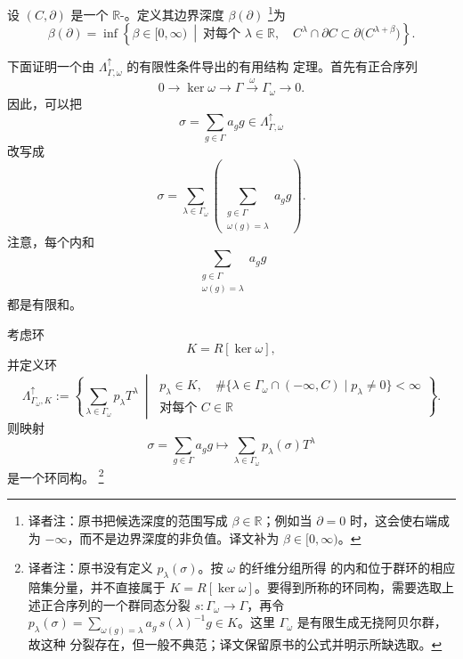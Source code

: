 \begin{definition}
\label{def:boundary-depth}
设 $(C,\partial)$ 是一个 $\mathbb R$-\termFilteredChainComplex{}。定义其边界深度
$\beta(\partial)$
\footnote{译者注：原书把候选深度的范围写成 $\beta\in\mathbb R$；例如当
$\partial=0$ 时，这会使右端成为 $-\infty$，而不是边界深度的非负值。译文补为
$\beta\in[0,\infty)$。}为
\[
  \beta(\partial)
  =\inf\left\{
    \beta\in[0,\infty)
    \ \middle|\
    \text{对每个 }\lambda\in\mathbb R,\quad
    C^\lambda\cap\partial C
    \subset\partial\bigl(C^{\lambda+\beta}\bigr)
  \right\}.
\]
\end{definition}

下面证明一个由 $\Lambda^\uparrow_{\Gamma,\omega}$ 的有限性条件导出的有用结构
定理。首先有正合序列
\[
  0\longrightarrow\ker\omega
  \longrightarrow\Gamma
  \xrightarrow{\ \omega\ }\Gamma_\omega
  \longrightarrow0.
\]
因此，可以把
\[
  \sigma=\sum_{g\in\Gamma}a_g g
  \in\Lambda^\uparrow_{\Gamma,\omega}
\]
改写成
\[
  \sigma
  =\sum_{\lambda\in\Gamma_\omega}
    \left(
      \sum_{\substack{g\in\Gamma\\\omega(g)=\lambda}}a_g g
    \right).
\]
注意，每个内和
\[
  \sum_{\substack{g\in\Gamma\\\omega(g)=\lambda}}a_g g
\]
都是有限和。

\begin{proposition}
\label{prop:novikov-ring-period-group-coefficients}
考虑环
\[
  K=R[\ker\omega],
\]
并定义环
\[
  \Lambda^\uparrow_{\Gamma_\omega,K}
  :=
  \left\{
    \sum_{\lambda\in\Gamma_\omega}p_\lambda T^\lambda
    \ \middle|\
    \begin{gathered}
      p_\lambda\in K,\quad
      \#\{\lambda\in\Gamma_\omega\cap(-\infty,C)
        \mid p_\lambda\ne0\}<\infty\\
      \text{对每个 }C\in\mathbb R
    \end{gathered}
  \right\}.
\]
则映射
\[
  \sigma=\sum_{g\in\Gamma}a_g g
  \longmapsto
  \sum_{\lambda\in\Gamma_\omega}p_\lambda(\sigma)T^\lambda
\]
是一个环同构。
\footnote{译者注：原书没有定义 $p_\lambda(\sigma)$。按 $\omega$ 的纤维分组所得
的内和位于群环的相应陪集分量，并不直接属于
$K=R[\ker\omega]$。要得到所称的环同构，需要选取上述正合序列的一个群同态分裂
$s:\Gamma_\omega\to\Gamma$，再令
$p_\lambda(\sigma)=\sum_{\omega(g)=\lambda}
a_g\,s(\lambda)^{-1}g\in K$。这里 $\Gamma_\omega$ 是有限生成无挠阿贝尔群，故这种
分裂存在，但一般不典范；译文保留原书的公式并明示所缺选取。}
\end{proposition}
